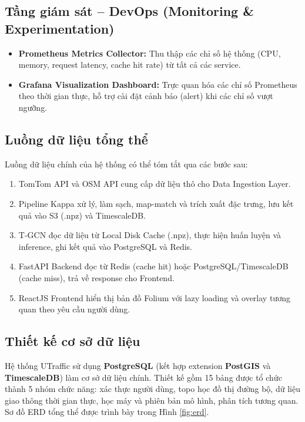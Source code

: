 \subsection{Tầng giám sát -- DevOps (Monitoring \& Experimentation)}

\begin{itemize}
    \item \textbf{Prometheus Metrics Collector:} Thu thập các chỉ số hệ thống (CPU, memory, request latency, cache hit rate) từ tất cả các service.
    \item \textbf{Grafana Visualization Dashboard:} Trực quan hóa các chỉ số Prometheus theo thời gian thực, hỗ trợ cài đặt cảnh báo (alert) khi các chỉ số vượt ngưỡng.
\end{itemize}

\subsection{Luồng dữ liệu tổng thể}

Luồng dữ liệu chính của hệ thống có thể tóm tắt qua các bước sau:

\begin{enumerate}
    \item TomTom API và OSM API cung cấp dữ liệu thô cho Data Ingestion Layer.
    \item Pipeline Kappa xử lý, làm sạch, map-match và trích xuất đặc trưng, lưu kết quả vào S3 (.npz) và TimescaleDB.
    \item T-GCN đọc dữ liệu từ Local Disk Cache (.npz), thực hiện huấn luyện và inference, ghi kết quả vào PostgreSQL và Redis.
    \item FastAPI Backend đọc từ Redis (cache hit) hoặc PostgreSQL/TimescaleDB (cache miss), trả về response cho Frontend.
    \item ReactJS Frontend hiển thị bản đồ Folium với lazy loading và overlay tương quan theo yêu cầu người dùng.
\end{enumerate}

\clearpage
\subsection{Thiết kế cơ sở dữ liệu}

Hệ thống UTraffic sử dụng \textbf{PostgreSQL} (kết hợp extension \textbf{PostGIS} và \textbf{TimescaleDB}) làm cơ sở dữ liệu chính. Thiết kế gồm 15 bảng được tổ chức thành 5 nhóm chức năng: xác thực người dùng, topo học đồ thị đường bộ, dữ liệu giao thông thời gian thực, học máy và phiên bản mô hình, phân tích tương quan. Sơ đồ ERD tổng thể được trình bày trong Hình \ref{fig:erd}.

